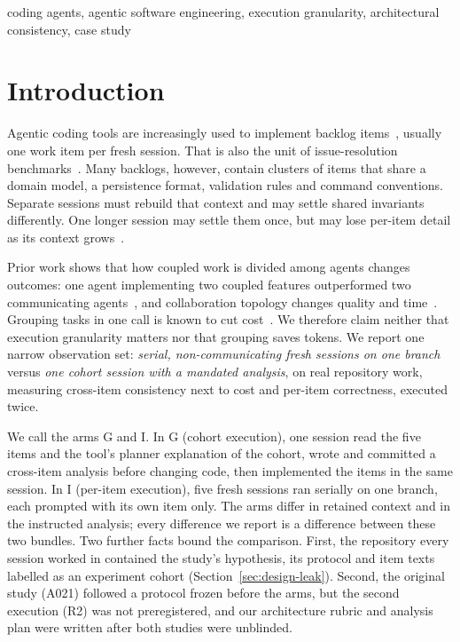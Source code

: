 \documentclass[10pt,conference]{IEEEtran}
\newcommand{\G}{G}
\newcommand{\I}{I}
\begin{document}
\begin{IEEEkeywords}
coding agents, agentic software engineering, execution granularity, architectural consistency, case study
\end{IEEEkeywords}

\section{Introduction}\label{sec:intro}

Agentic coding tools are increasingly used to implement backlog items~\cite{watanabe2025agentic}, usually one work item per fresh session. That is also the unit of issue-resolution benchmarks~\cite{jimenez2024swebench,yang2024sweagent}. Many backlogs, however, contain clusters of items that share a domain model, a persistence format, validation rules and command conventions. Separate sessions must rebuild that context and may settle shared invariants differently. One longer session may settle them once, but may lose per-item detail as its context grows~\cite{liu2024lost}.

Prior work shows that how coupled work is divided among agents changes outcomes: one agent implementing two coupled features outperformed two communicating agents~\cite{khatua2026cooperbench}, and collaboration topology changes quality and time~\cite{ren2026coordination}. Grouping tasks in one call is known to cut cost~\cite{cheng2023batch,son2024multitask}. We therefore claim neither that execution granularity matters nor that grouping saves tokens. We report one narrow observation set: \emph{serial, non-communicating fresh sessions on one branch} versus \emph{one cohort session with a mandated analysis}, on real repository work, measuring cross-item consistency next to cost and per-item correctness, executed twice.

We call the arms \G{} and \I. In \G{} (cohort execution), one session read the five items and the tool's planner explanation of the cohort, wrote and committed a cross-item analysis before changing code, then implemented the items in the same session. In \I{} (per-item execution), five fresh sessions ran serially on one branch, each prompted with its own item only. %
The arms differ in retained context and in the instructed analysis; every difference we report is a difference between these two bundles. %
Two further facts bound the comparison. First, the repository every session worked in contained the study's hypothesis, its protocol and item texts labelled as an experiment cohort (Section~\ref{sec:design-leak}). Second, the original study (A021) followed a protocol frozen before the arms, but the second execution (R2) was not preregistered, and our architecture rubric and analysis plan were written after both studies were unblinded. %
\end{document}
